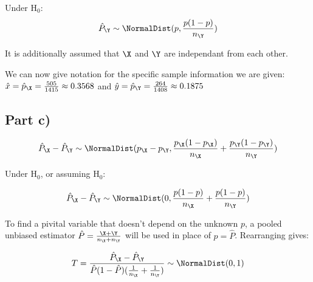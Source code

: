Under $\text{H}_0$:
\[
\hat{P}_\Y \sim \NormalDist (p, \frac{p (1 - p)}{n_\Y})
\]

It is additionally assumed that $\X$ and $\Y$ are independant from each other.

We can now give notation for the specific sample information we are given:
$\hat{x} = \hat{p}_\X = \frac{505}{1415} \approx 0.3568$ and $\hat{y} = \hat{p}_\Y = \frac{264}{1408} \approx 0.1875$

\subsection{Part c)}

\[
\hat{P}_\X - \hat{P}_\Y \sim \NormalDist (p_\X - p_\Y, \frac{p_\X(1-p_\X)}{n_\X} + \frac{p_\Y(1-p_\Y)}{n_\Y})
\]

Under $\text{H}_0$, or assuming $\text{H}_0$:

\[
\hat{P}_\X - \hat{P}_\Y \sim \NormalDist (0, \frac{p(1-p)}{n_\X} + \frac{p(1-p)}{n_\Y})
\]

To find a pivital variable that doesn't depend on the unknown $p$, a pooled unbiased estimator $\hat{P} = \frac{\X + \Y}{n_\X + n_\Y}$
will be used in place of $p = \hat{P}$. Rearranging gives:

\[
T = \frac{\hat{P}_\X - \hat{P}_\Y}{\hat{P}(1 - \hat{P})(\frac{1}{n_\X} + \frac{1}{n_\Y})} \sim \NormalDist(0, 1)
\]
